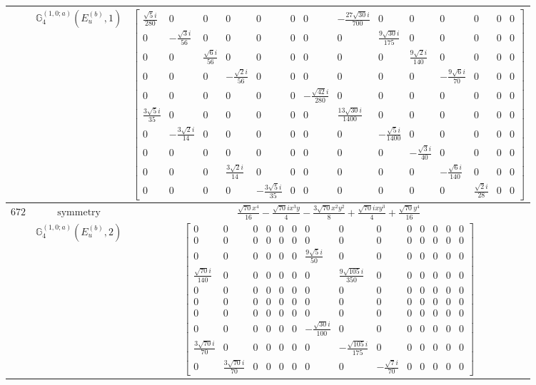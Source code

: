 \documentclass[fleqn,8pt,landscape]{jsarticle}
\begin{document}
\begin{longtable}{ccc}
$  $ & $ \mathbb{G}_{4}^{(1,0;a)}(E_{u}^{(b)},1) $ & $ \begin{bmatrix} \frac{\sqrt{5} i}{280} & 0 & 0 & 0 & 0 & 0 & 0 & - \frac{27 \sqrt{30} i}{700} & 0 & 0 & 0 & 0 & 0 & 0 \\ 0 & - \frac{\sqrt{3} i}{56} & 0 & 0 & 0 & 0 & 0 & 0 & \frac{9 \sqrt{30} i}{175} & 0 & 0 & 0 & 0 & 0 \\ 0 & 0 & \frac{\sqrt{6} i}{56} & 0 & 0 & 0 & 0 & 0 & 0 & \frac{9 \sqrt{2} i}{140} & 0 & 0 & 0 & 0 \\ 0 & 0 & 0 & - \frac{\sqrt{2} i}{56} & 0 & 0 & 0 & 0 & 0 & 0 & - \frac{9 \sqrt{6} i}{70} & 0 & 0 & 0 \\ 0 & 0 & 0 & 0 & 0 & 0 & - \frac{\sqrt{42} i}{280} & 0 & 0 & 0 & 0 & 0 & 0 & 0 \\ \frac{3 \sqrt{5} i}{35} & 0 & 0 & 0 & 0 & 0 & 0 & \frac{13 \sqrt{30} i}{1400} & 0 & 0 & 0 & 0 & 0 & 0 \\ 0 & - \frac{3 \sqrt{2} i}{14} & 0 & 0 & 0 & 0 & 0 & 0 & - \frac{\sqrt{5} i}{1400} & 0 & 0 & 0 & 0 & 0 \\ 0 & 0 & 0 & 0 & 0 & 0 & 0 & 0 & 0 & - \frac{\sqrt{3} i}{40} & 0 & 0 & 0 & 0 \\ 0 & 0 & 0 & \frac{3 \sqrt{2} i}{14} & 0 & 0 & 0 & 0 & 0 & 0 & - \frac{\sqrt{6} i}{140} & 0 & 0 & 0 \\ 0 & 0 & 0 & 0 & - \frac{3 \sqrt{5} i}{35} & 0 & 0 & 0 & 0 & 0 & 0 & \frac{\sqrt{2} i}{28} & 0 & 0 \end{bmatrix} $ \\ \hline
$ 672 $ & $ \text{symmetry} $ & $ \frac{\sqrt{70} x^{4}}{16} - \frac{\sqrt{70} i x^{3} y}{4} - \frac{3 \sqrt{70} x^{2} y^{2}}{8} + \frac{\sqrt{70} i x y^{3}}{4} + \frac{\sqrt{70} y^{4}}{16} $ \\
$  $ & $ \mathbb{G}_{4}^{(1,0;a)}(E_{u}^{(b)},2) $ & $ \begin{bmatrix} 0 & 0 & 0 & 0 & 0 & 0 & 0 & 0 & 0 & 0 & 0 & 0 & 0 & 0 \\ 0 & 0 & 0 & 0 & 0 & 0 & 0 & 0 & 0 & 0 & 0 & 0 & 0 & 0 \\ 0 & 0 & 0 & 0 & 0 & 0 & \frac{9 \sqrt{5} i}{50} & 0 & 0 & 0 & 0 & 0 & 0 & 0 \\ \frac{\sqrt{70} i}{140} & 0 & 0 & 0 & 0 & 0 & 0 & \frac{9 \sqrt{105} i}{350} & 0 & 0 & 0 & 0 & 0 & 0 \\ 0 & 0 & 0 & 0 & 0 & 0 & 0 & 0 & 0 & 0 & 0 & 0 & 0 & 0 \\ 0 & 0 & 0 & 0 & 0 & 0 & 0 & 0 & 0 & 0 & 0 & 0 & 0 & 0 \\ 0 & 0 & 0 & 0 & 0 & 0 & 0 & 0 & 0 & 0 & 0 & 0 & 0 & 0 \\ 0 & 0 & 0 & 0 & 0 & 0 & - \frac{\sqrt{30} i}{100} & 0 & 0 & 0 & 0 & 0 & 0 & 0 \\ \frac{3 \sqrt{70} i}{70} & 0 & 0 & 0 & 0 & 0 & 0 & - \frac{\sqrt{105} i}{175} & 0 & 0 & 0 & 0 & 0 & 0 \\ 0 & \frac{3 \sqrt{70} i}{70} & 0 & 0 & 0 & 0 & 0 & 0 & - \frac{\sqrt{7} i}{70} & 0 & 0 & 0 & 0 & 0 \end{bmatrix} $ \\ \hline

\end{longtable}
\end{document}

